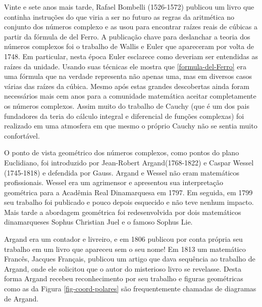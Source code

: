 \begin{subappendices}
Vinte e sete anos mais tarde, Rafael Bombelli (1526-1572) publicou um livro
que continha instruções do que viria a ser no futuro as regras da aritmética no 
conjunto dos números complexo e as usou para encontrar raízes reais de cúbicas
a partir da fórmula de del Ferro. A publicação chave para deslanchar a teoria
dos números complexos foi o trabalho de Wallis e Euler que apareceram por volta de 1748.
Em particular, nesta época Euler esclarece como deveriam ser entendidas as raízes da unidade.
Usando suas técnicas ele mostra que \eqref{formula-del-Ferro} 
era uma fórmula que na verdade representa não apenas uma, mas em diversos casos 
várias das raízes da cúbica. Mesmo após estas grandes descobertas ainda foram necessários
mais cem anos para a comunidade matemática aceitar completamente os números complexos.
Assim muito do trabalho de Cauchy (que é um dos pais fundadores da teria do cálculo integral e diferencial
de funções complexas) foi realizado em uma atmosfera em que mesmo o próprio Cauchy não se sentia muito 
confortável. 

O ponto de vista geométrico dos números complexos, como pontos do plano Euclidiano, 
foi introduzido por Jean-Robert Argand(1768-1822) e Caspar Wessel (1745-1818) e defendida
por Gauss. Argand e Wessel não eram matemáticos profissionais. Wessel era um agrimensor
e apresentou sua interpretação geométrica para a Acadêmia Real Dinamarquesa em 1797.
Em seguida, em 1799 seu trabalho foi publicado e pouco depois esquecido e não teve
nenhum impacto. Mais tarde a abordagem geométrica foi redesenvolvida por 
dois matemáticos dinamarqueses Sophus Christian Juel e o famoso Sophus Lie.

Argand era um contador e livreiro, e em 1806 publicou por conta própria seu 
trabalho em um livro que apareceu sem o seu nome! Em 1813 um matemático Francês,
Jacques Français, publicou um artigo que dava sequência ao trabalho de Argand,
onde ele solicitou que o autor do misterioso livro se revelasse. Desta forma 
Argand recebeu reconhecimento por seu trabalho e figuras 
geométricas como as da Figura \ref{fig-coord-polares} são frequentemente chamadas de diagramas
de Argand. 



\end{subappendices}
